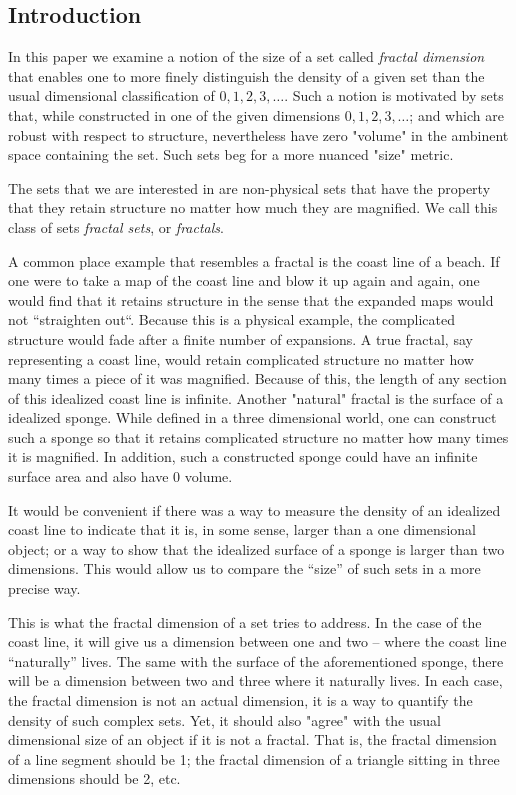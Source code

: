 \subsection{Introduction}
{\parindent=0pt
In this paper we examine a notion of the size of a set called 
{\it fractal dimension} that enables one to more
finely distinguish the density of a given set than the usual
dimensional classification of $0, 1, 2, 3, \ldots$.%
Such a notion is motivated by sets that, while constructed in one of the given
dimensions $0, 1, 2, 3, \dots$; and which are robust with respect to structure, 
nevertheless have zero "volume" in the ambinent space containing the set.
Such sets beg for a more nuanced "size" metric.

The sets that we are interested in are non-physical sets that
have the property that they retain structure no matter how much 
they are magnified. We call this class of sets
{\it fractal sets}, or
{\it fractals}. 

A common place example that resembles a fractal is the coast line of
a beach. If one were to take a map of the coast line and blow it up
again and again, one would find that it retains structure in the
sense that the expanded maps would not ``straighten out``.
Because this is a physical example, the complicated structure would fade
after a finite number of expansions. A true fractal, say representing a 
coast line, would retain complicated
structure no matter how many times a piece of it was magnified.
Because of this, the length of any section of this idealized coast line is
infinite. Another "natural" fractal is the surface of a idealized sponge.
While defined in a three dimensional world, one can construct such a sponge so that
it retains complicated structure no matter how many times it is magnified.
In addition, such a constructed sponge could have an infinite surface area and 
also have 0 volume. 

It would be convenient if there was a way to
measure the density of an idealized coast line to
indicate that it is, in some sense, larger than a one dimensional
object; or a way to show that the idealized surface of a sponge is larger than
two dimensions. This would allow us to compare the ``size'' of such sets
in a more precise way.

This is what the fractal dimension of a set tries to address. 
In the case of the coast line, it will give us a dimension between one and two
-- where the coast line ``naturally'' lives. The same with the surface of
the aforementioned sponge,
there will be a dimension between two and three where it naturally lives. In
each case, the fractal dimension is not an actual dimension, 
it is a way to quantify the density of such complex sets.
Yet, it should also "agree" with the usual dimensional size of an object 
if it is not a fractal. That is, the fractal dimension of a line segment should 
be 1; the fractal dimension of a triangle sitting in three dimensions should 
be 2, etc.

}
